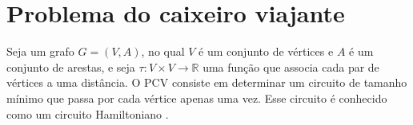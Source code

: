 


\section{Problema do caixeiro viajante}


Seja um grafo $G = (V,A)$, no qual $V$ é um conjunto de vértices e $A$ é um conjunto de arestas, e seja $\tau:V\times V \rightarrow \mathds{R}$ uma função que associa cada par de vértices a uma distância. O \ac{PCV} consiste em determinar um circuito de tamanho mínimo que passa por cada vértice apenas uma vez. Esse circuito é conhecido como um circuito Hamiltoniano \cite{laporte:1992}.

